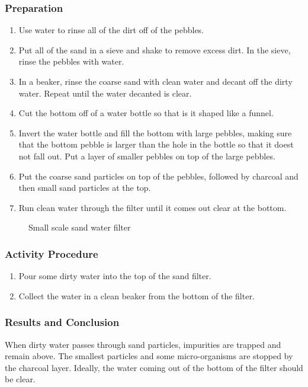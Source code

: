 \subsubsection*{Preparation}
\begin{enumerate}
\item{Use water to rinse all of the dirt off of the pebbles.}
\item{Put all of the sand in a sieve and shake to remove excess dirt. In the sieve, rinse the pebbles with water.}
\item{In a beaker, rinse the coarse sand with clean water and decant off the dirty water. Repeat until the water decanted is clear.}
\item{Cut the bottom off of a water bottle so that is it shaped like a funnel.}
\item{Invert the water bottle and fill the bottom with large pebbles, making sure that the bottom pebble is larger than the hole in the bottle so that it doest not fall out. Put a layer of smaller pebbles on top of the large pebbles.}
\item{Put the coarse sand particles on top of the pebbles, followed by charcoal and then small sand particles at the top.}
\item{Run clean water through the filter until it comes out clear at the bottom.}
\end{enumerate}
\begin{figure}[h!]
\begin{center}
\def\svgwidth{250pt}

\caption{Small scale sand water filter}
\end{center}
\end{figure}
\subsubsection*{Activity Procedure}
\begin{enumerate}
\item{Pour some dirty water into the top of the sand filter.}
\item{Collect the water in a clean beaker from the bottom of the filter.}
\end{enumerate}

\subsubsection*{Results and Conclusion}
When dirty water passes through sand particles, impurities are trapped and remain above. The smallest particles and some micro-organisms are stopped by the charcoal layer. Ideally, the water coming out of the bottom of the filter should be clear. 

